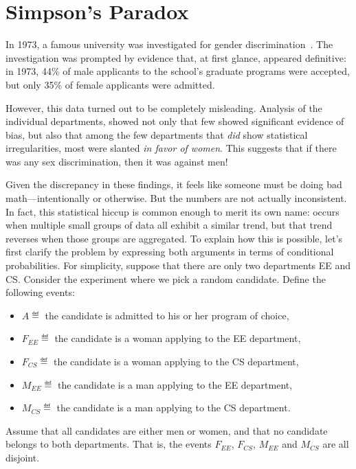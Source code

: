 \section{Simpson's Paradox}\label{discrimination_subsec}

In 1973, a famous university was investigated for gender
discrimination~\cite{Berkeley75}.  The investigation was prompted by
evidence that, at first glance, appeared definitive: in 1973, 44\% of
male applicants to the school's graduate programs were accepted, but
only 35\% of female applicants were admitted.

However, this data turned out to be completely misleading.  Analysis
of the individual departments, showed not only that few showed
significant evidence of bias, but also that among the few departments
that \emph{did} show statistical irregularities, most were slanted
\emph{in favor of women}.  This suggests that if there was any sex
discrimination, then it was against men!

Given the discrepancy in these findings, it feels like someone must be
doing bad math---intentionally or otherwise.  But the numbers are not
actually inconsistent.  In fact, this statistical hiccup is common
enough to merit its own name:  occurs when
multiple small groups of data all exhibit a similar trend, but that
trend reverses when those groups are aggregated.  To explain how this
is possible, let's first clarify the problem by expressing both
arguments in terms of conditional probabilities.  For simplicity,
suppose that there are only two departments EE and CS.  Consider the
experiment where we pick a random candidate.  Define the following
events:
%
\begin{itemize}
\item $A \eqdef$ the candidate is admitted to his or her program of choice,
\item $F_{EE} \eqdef$ the candidate is a woman applying to the EE department,
\item $F_{CS} \eqdef$ the candidate is a woman applying to the CS department,
\item $M_{EE} \eqdef$ the candidate is a man applying to the EE department,
\item $M_{CS} \eqdef$ the candidate is a man applying to the CS department.
\end{itemize}
Assume that all candidates are either men or women, and that no
candidate belongs to both departments. That is,  the events $F_{EE}$,
$F_{CS}$, $M_{EE}$ and $M_{CS}$ are all disjoint.

